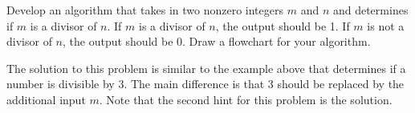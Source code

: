 \documentclass{ximera}
\begin{document}
\begin{question}
	Develop an algorithm that takes in two nonzero integers $m$ and $n$ and determines if $m$ is a divisor of $n$. If $m$ is a divisor of $n$, the output should be 1. If $m$ is not a divisor of $n$, the output should be 0. Draw a flowchart for your algorithm.
	\begin{hint}
		The solution to this problem is similar to the example above that determines if a number is divisible by 3. The main difference is that 3 should be replaced by the additional input $m$. Note that the second hint for this problem is the solution.
	\end{hint}
	\begin{hint}
		\begin{center}
		\end{center}
	\end{hint}
\end{question}
\end{document}
